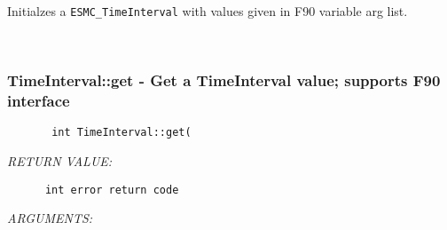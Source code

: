         Initialzes a {\tt ESMC\_TimeInterval} with values given in F90
        variable arg list.
   
 
\mbox{}\hrulefill\ 
 
\subsubsection [TimeInterval::get] {TimeInterval::get - Get a TimeInterval value; supports F90 interface}


  
\begin{verbatim}       int TimeInterval::get(\end{verbatim}{\em RETURN VALUE:}
\begin{verbatim}      int error return code\end{verbatim}{\em ARGUMENTS:}
